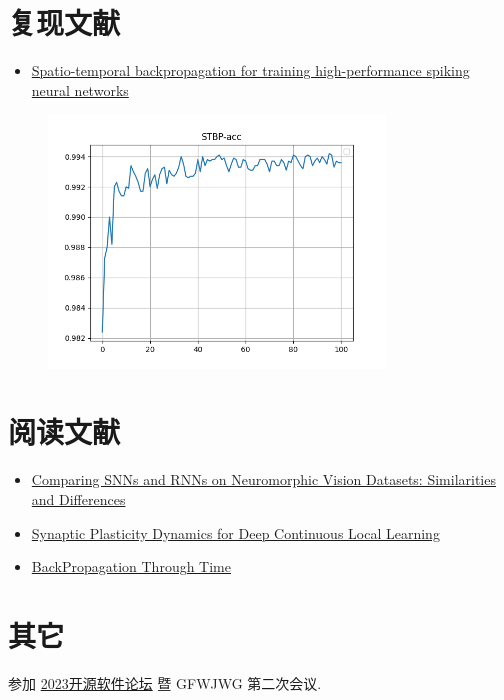 \documentclass[a4paper]{article}
\begin{document}
\section{复现文献}

\begin{itemize}
    \item \href{https://www.frontiersin.org/articles/10.3389/fnins.2018.00331/full}{Spatio-temporal backpropagation for training high-performance spiking neural networks}
\end{itemize}



\begin{figure}[hb]
    \centering
    \includegraphics[width=0.8\textwidth]{figures/STBP-acc.png}
    \label{fig:s1}
\end{figure}

\section{阅读文献}

\begin{itemize}
    \item \href{https://arxiv.org/abs/2005.02183}{Comparing SNNs and RNNs on Neuromorphic Vision Datasets: Similarities and Differences}
    \item \href{https://arxiv.org/abs/1811.10766}{Synaptic Plasticity Dynamics for Deep Continuous Local Learning}
    \item \href{http://ir.hit.edu.cn/~jguo/docs/notes/bptt.pdf}{BackPropagation Through Time}
\end{itemize}

\section{其它}

参加 \href{https://box.nju.edu.cn/f/c970af185163433d9a38/}{2023开源软件论坛} 暨 GFWJWG 第二次会议.
\end{document}

